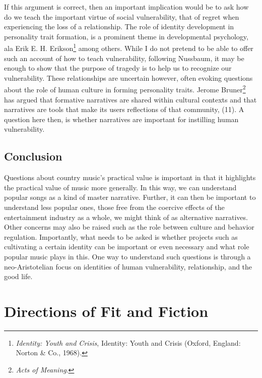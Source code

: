 \documentclass[
  12pt,
]{book}
\theoremstyle{definition}
\theoremstyle{definition}
\theoremstyle{definition}
\theoremstyle{definition}
\theoremstyle{remark}
\begin{document}
If this argument is correct, then an important implication would be to ask how do we teach the important virtue of social vulnerability, that of regret when experiencing the loss of a relationship. The role of identity development in personality trait formation, is a prominent theme in developmental psychology, ala Erik E. H. Erikson\footnote{\emph{Identity: Youth and Crisis}, Identity: Youth and Crisis (Oxford, England: Norton \& Co., 1968).} among others. While I do not pretend to be able to offer such an account of how to teach vulnerability, following Nussbaum, it may be enough to show that the purpose of tragedy is to help us to recognize our vulnerability. These relationships are uncertain however, often evoking questions about the role of human culture in forming personality traits. Jerome Bruner\footnote{\emph{Acts of Meaning}.} has argued that formative narratives are shared within cultural contexts and that narratives are tools that make its users reflections of that community, (11). A question here then, is whether narratives are important for instilling human vulnerability.

\section{Conclusion}\label{conclusion}

Questions about country music's practical value is important in that it highlights the practical value of music more generally. In this way, we can understand popular songs as a kind of master narrative. Further, it can then be important to understand less popular ones, those free from the coercive effects of the entertainment industry as a whole, we might think of as alternative narratives. Other concerns may also be raised such as the role between culture and behavior regulation. Importantly, what needs to be asked is whether projects such as cultivating a certain identity can be important or even necessary and what role popular music plays in this. One way to understand such questions is through a neo-Aristotelian focus on identities of human vulnerability, relationship, and the good life.

\chapter{Directions of Fit and Fiction}\label{directions-of-fit-and-fiction}
\end{document}
